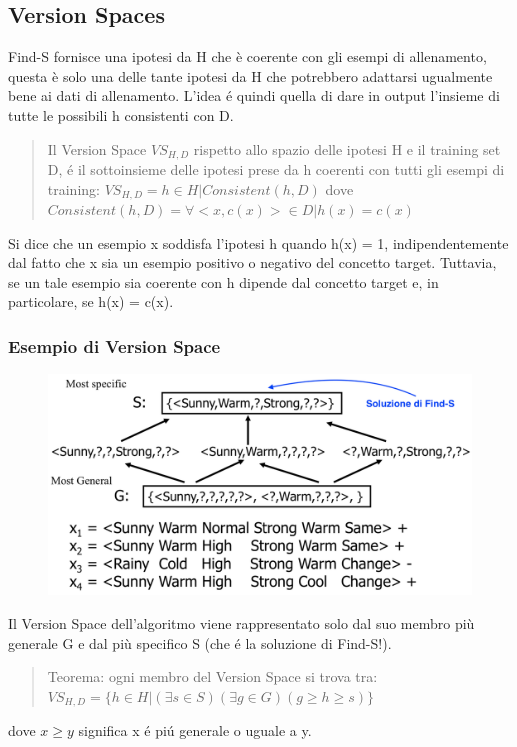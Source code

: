 \documentclass{article}
\begin{document}
\subsection{Version Spaces}
Find-S fornisce una ipotesi da H che è coerente con gli esempi di allenamento, questa è solo una delle tante ipotesi da H che potrebbero adattarsi ugualmente bene ai dati di allenamento. L'idea é quindi quella di dare in output l'insieme di tutte le possibili h consistenti con D.
\begin{quote}
    Il Version Space $VS_{H,D}$ rispetto allo spazio delle ipotesi H e il training set D, é il sottoinsieme delle ipotesi prese da h coerenti con tutti gli esempi di training: $VS_{H,D} = {h \in H | Consistent(h,D) }$ dove $Consistent(h,D) = \forall<x,c(x)> \in D | h(x)=c(x)$
\end{quote}
Si dice che un esempio x soddisfa l'ipotesi h quando h(x) = 1, indipendentemente dal fatto che x sia un esempio positivo o negativo del concetto target. Tuttavia, se un tale esempio sia coerente con h dipende dal concetto target e, in particolare, se h(x) = c(x).

\subsubsection{Esempio di Version Space }
\begin{figure}[H]
    \centering
    \includegraphics[scale=0.4]{Images/versionspacegs.png}
\end{figure}
Il Version Space dell'algoritmo viene rappresentato solo dal suo membro più generale G e dal più specifico S (che é la soluzione di Find-S!).
\begin{quote}
    Teorema: ogni membro del Version Space si trova tra: $VS_{H,D} = \{h \in H| (\exists s \in S) (\exists g \in G) (g \geq h \geq s)\}$
\end{quote}
dove $x \geq y$ significa x é piú generale o uguale a y.
\end{document}
